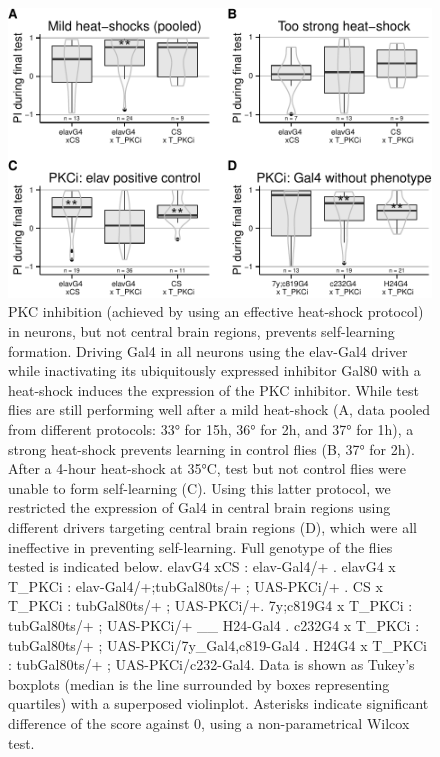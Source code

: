\documentclass[]{article}
\begin{document}
\begin{figure}[htbp]
\centering
\includegraphics{firsttest_files/figure-latex/unnamed-chunk-3-1.pdf}
\caption{\label{fig:heatshock} PKC inhibition (achieved by using an
effective heat-shock protocol) in neurons, but not central brain
regions, prevents self-learning formation. Driving Gal4 in all neurons
using the elav-Gal4 driver while inactivating its ubiquitously expressed
inhibitor Gal80 with a heat-shock induces the expression of the PKC
inhibitor. While test flies are still performing well after a mild
heat-shock (A, data pooled from different protocols: 33° for 15h, 36°
for 2h, and 37° for 1h), a strong heat-shock prevents learning in
control flies (B, 37° for 2h). After a 4-hour heat-shock at 35°C, test
but not control flies were unable to form self-learning (C). Using this
latter protocol, we restricted the expression of Gal4 in central brain
regions using different drivers targeting central brain regions (D),
which were all ineffective in preventing self-learning. Full genotype of
the flies tested is indicated below. elavG4 xCS : elav-Gal4/+ . elavG4 x
T\_PKCi : elav-Gal4/+;tubGal80ts/+ ; UAS-PKCi/+ . CS x T\_PKCi :
tubGal80ts/+ ; UAS-PKCi/+. 7y;c819G4 x T\_PKCi : tubGal80ts/+ ;
UAS-PKCi/+ \_\_ H24-Gal4 . c232G4 x T\_PKCi : tubGal80ts/+ ;
UAS-PKCi/7y\_Gal4,c819-Gal4 . H24G4 x T\_PKCi : tubGal80ts/+ ;
UAS-PKCi/c232-Gal4. Data is shown as Tukey's boxplots (median is the
line surrounded by boxes representing quartiles) with a superposed
violinplot. Asterisks indicate significant difference of the score
against 0, using a non-parametrical Wilcox test.}
\end{figure}
\end{document}

